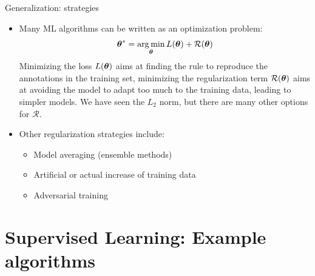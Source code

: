 \documentclass[xcolor=pdftex,dvipsnames,table]{beamer}
\begin{document}
\begin{frame}{Generalization: strategies}
\begin{itemize}
\item Many ML algorithms can be written as an optimization problem:
\begin{equation*}
\boldsymbol{\theta} ^{\ast} = \operatorname*{arg\,min}_{\boldsymbol{\theta}} L (\boldsymbol{\theta}) + \mathcal{R}(\boldsymbol{\theta})
\end{equation*}
Minimizing the loss $L (\boldsymbol{\theta})$ aims at finding the rule to reproduce the annotations in the training set, minimizing the regularization term $\mathcal{R}(\boldsymbol{\theta})$ aims at avoiding the model to adapt too much to the training data, leading to simpler models. We have seen the $L_2$ norm, but there are many other options for $\mathcal{R}$.
\item Other regularization strategies include:
\begin{itemize}
\item Model averaging (ensemble methods)
\item Artificial or actual increase of training data
\item Adversarial training
\end{itemize}
\end{itemize}
\end{frame}

\section{Supervised Learning: Example algorithms}


\end{document}
